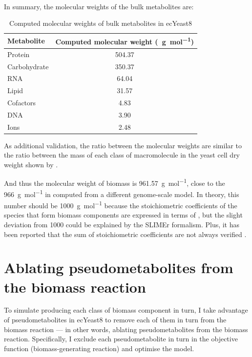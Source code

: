 In summary, the molecular weights of the bulk metabolites are:
\begin{table}[ht]
  \centering
  \begin{tabular}{lS}
    Metabolite & {Computed molecular weight (\SI{}{\gram~\mol^{-1}})} \\
    \hline
    Protein & 504.37 \\
    Carbohydrate & 350.37 \\
    RNA & 64.04 \\
    Lipid & 31.57 \\
    Cofactors & 4.83 \\
    DNA & 3.90 \\
    Ions & 2.48
  \end{tabular}
  \caption{Computed molecular weights of bulk metabolites in ecYeast8}
  \label{tab:ecyeast8-mol-weights}
\end{table}

As additional validation, the ratio between the molecular weights are similar to the ratio between the mass of each class of macromolecule in the yeast cell dry weight shown by \textcite{canelasVivoDatadrivenFramework2011}.

And thus the molecular weight of biomass is \SI{961.57}{\gram~\mol^{-1}}, close to the \SI{966}{\gram~\mol^{-1}} in \textcite{takhaveevTemporalSegregationBiosynthetic2023} computed from a different genome-scale model.
In theory, this number should be \SI{1000}{\gram~\mol^{-1}} because the stoichiometric coefficients of the species that form biomass components are expressed in terms of \SI{}{\mmolgdw} \parencite{thieleProtocolGeneratingHighquality2010, palssonSystemsBiologyConstraintbased2015}, but the slight deviation from 1000 could be explained by the SLIMEr formalism.
Plus, it has been reported that the sum of stoichiometric coefficients are not always verified \parencite{chanStandardizingBiomassReactions2017}.

\section{Ablating pseudometabolites from the biomass reaction}
\label{sec:model-yeast8-pseudometabolites}

To simulate producing each class of biomass component in turn,
I take advantage of pseudometabolites in ecYeast8 to remove each of them in turn from the biomass reaction ---
in other words, ablating pseudometabolites from the biomass reaction.
Specifically, I exclude each pseudometabolite in turn in the objective function (biomass-generating reaction) and optimise the model.

